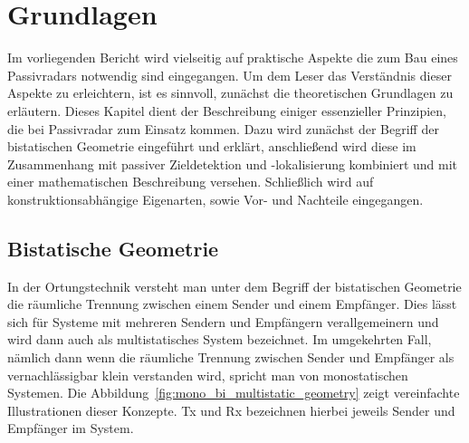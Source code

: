 \chapter{Grundlagen}

Im vorliegenden Bericht wird vielseitig auf praktische Aspekte die zum Bau eines Passivradars notwendig sind eingegangen. Um dem Leser das Verständnis dieser Aspekte zu erleichtern, ist es sinnvoll, zunächst die theoretischen Grundlagen zu erläutern. Dieses Kapitel dient der Beschreibung einiger essenzieller Prinzipien, die bei Passivradar zum Einsatz kommen. Dazu wird zunächst der Begriff der bistatischen Geometrie eingeführt und erklärt, anschließend wird diese im Zusammenhang mit passiver Zieldetektion und -lokalisierung kombiniert und mit einer mathematischen Beschreibung versehen. Schließlich wird auf konstruktionsabhängige Eigenarten, sowie Vor- und Nachteile eingegangen.

\section{Bistatische Geometrie}

In der Ortungstechnik versteht man unter dem Begriff der bistatischen Geometrie die räumliche Trennung zwischen einem Sender und einem Empfänger. Dies lässt sich für Systeme mit mehreren Sendern und Empfängern verallgemeinern und wird dann auch als multistatisches System bezeichnet. Im umgekehrten Fall, nämlich dann wenn die räumliche Trennung zwischen Sender und Empfänger als vernachlässigbar klein verstanden wird, spricht man von monostatischen Systemen. Die Abbildung~\ref{fig:mono_bi_multistatic_geometry} zeigt vereinfachte Illustrationen dieser Konzepte. Tx und Rx bezeichnen hierbei jeweils Sender und Empfänger im System.

